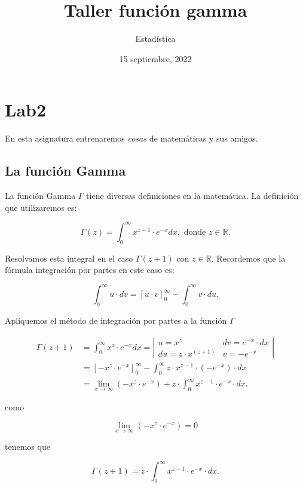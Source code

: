 \documentclass[
]{article}
\title{Taller función gamma}
\author{Estadística}
\date{15 septiembre, 2022}
\begin{document}
\maketitle

{
\hypersetup{linkcolor=blue}
\setcounter{tocdepth}{2}
\tableofcontents
}
\hypertarget{lab2}{%
\section{Lab2}\label{lab2}}

En esta asignatura entrenaremos \emph{cosas} de matemáticas y sus
amigos.

\hypertarget{la-funciuxf3n-gamma}{%
\subsection{La función Gamma}\label{la-funciuxf3n-gamma}}

La función Gamma \(\Gamma\) tiene diversas definiciones en la
matemática. La definición que utilizaremos es:

\[ \Gamma(z)= \int_0^{\infty} x^{z-1} \cdot e^{-x}dx, \mbox{ donde } z\in \mathbb{R}.\]

Resolvamos esta integral en el caso \(\Gamma(z+1)\) con
\(z\in \mathbb{R}\). Recordemos que la fórmula integración por partes en
este caso es:

\[\int_{0}^{\infty} u \cdot d v =\left[u\cdot v \right]_0^\infty-\int_0^{\infty} v \cdot du.\]

Apliquemos el método de integración por partes a la función \(\Gamma\)

\[
\begin{aligned}
\Gamma(z+1) &=  \int_0^{\infty} x^{z} \cdot e^{-x}dx= 
\left|
\begin{matrix} u=x^{z}  & dv= e^{-x}\cdot  dx 
\\ du= z \cdot x^(z+1)  & v=-e^{-x} 
\end{matrix}
\right|
\\
&=\left[-x^z\cdot e^{-x}\right]_0^\infty
-\int_0^{\infty} z\cdot x^{z-1} \cdot \left(-e^{-x}\right)\cdot  dx
\\
&=
\lim_{x\to\infty}\left(-x^z\cdot e^{-x}\right)
+
z\cdot \int_0^{\infty} x^{z-1} \cdot e^{-x}\cdot dx.
\end{aligned}
\]

como

\[\lim_{x\to\infty}\left(-x^z\cdot e^{-x}\right)=0\]

tenemos que

\[\Gamma(z+1)= 
z\cdot \int_0^{\infty} x^{z-1} \cdot e^{-x}\cdot  dx.
\]
\end{document}
